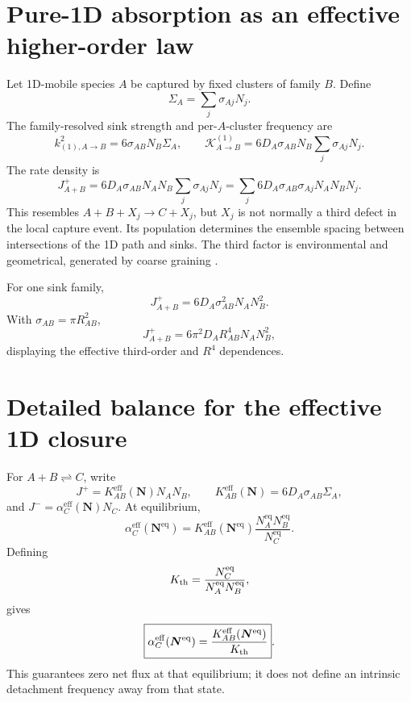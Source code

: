 \documentclass[11pt]{article}
\newcommand{\Kern}{\mathcal{K}}
\newcommand{\beq}{\mathrm{eq}}
\newcommand{\eff}{\mathrm{eff}}
\begin{document}
\section{Pure-1D absorption as an effective higher-order law}
Let 1D-mobile species \(A\) be captured by fixed clusters of family \(B\).
Define
\begin{equation}
 \Sigma_A=\sum_j\sigma_{Aj}N_j.
\end{equation}
The family-resolved sink strength and per-\(A\)-cluster frequency are
\begin{equation}
 k_{(1),A\to B}^{2}=6\sigma_{AB}N_B\Sigma_A,\qquad
 \Kern^{(1)}_{A\to B}
 =6D_A\sigma_{AB}N_B\sum_j\sigma_{Aj}N_j.
\end{equation}
The rate density is
\begin{equation}
 \boxed{J_{A+B}^{+}
 =6D_A\sigma_{AB}N_AN_B\sum_j\sigma_{Aj}N_j}
 =\sum_j6D_A\sigma_{AB}\sigma_{Aj}N_AN_BN_j.
 \label{eq:1d-rate}
\end{equation}
This resembles \(A+B+X_j\to C+X_j\), but \(X_j\) is not normally a third
defect in the local capture event. Its population determines the ensemble
spacing between intersections of the 1D path and sinks. The third factor is
environmental and geometrical, generated by coarse graining
\cite{Borodin1998,Barashev2001,Adjanor2022}.

For one sink family,
\begin{equation}
 \boxed{J_{A+B}^{+}=6D_A\sigma_{AB}^{2}N_AN_B^2}.
\end{equation}
With \(\sigma_{AB}=\pi R_{AB}^{2}\),
\begin{equation}
 J_{A+B}^{+}=6\pi^2D_AR_{AB}^{4}N_AN_B^2,
\end{equation}
displaying the effective third-order and \(R^4\) dependences.

\section{Detailed balance for the effective 1D closure}
For \(A+B\rightleftharpoons C\), write
\begin{equation}
 J^{+}=K_{AB}^{\eff}(\bm N)N_AN_B,\qquad
 K_{AB}^{\eff}(\bm N)=6D_A\sigma_{AB}\Sigma_A,
\end{equation}
and \(J^{-}=\alpha_C^{\eff}(\bm N)N_C\). At equilibrium,
\begin{equation}
 \boxed{\alpha_C^{\eff}(\bm N^{\beq})
 =K_{AB}^{\eff}(\bm N^{\beq})
 \frac{N_A^{\beq}N_B^{\beq}}{N_C^{\beq}}}.
 \label{eq:effective-db}
\end{equation}
Defining
\[
 K_{\rm th}=\frac{N_C^{\beq}}{N_A^{\beq}N_B^{\beq}},
\]
gives
\begin{equation}
 \boxed{\alpha_C^{\eff}(\bm N^{\beq})
 =\frac{K_{AB}^{\eff}(\bm N^{\beq})}{K_{\rm th}}}.
\end{equation}
This guarantees zero net flux at that equilibrium; it does not define an
intrinsic detachment frequency away from that state.
\end{document}
